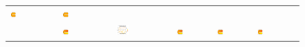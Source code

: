 \documentclass[a4paper,11pt,twoside,openright]{book}							%
\begin{document}
\begin{landscape}
\begin{figure}
\begin{tabular}{lccccccc}
\includegraphics[trim=0cm 0cm 0cm 1.8cm,clip=true,width=0.19\textwidth,valign=t]{Immagini/simulazioni_covar/SOAPtempo3.png}&
\includegraphics[trim=0cm 0cm 0cm 1.8cm,clip=true,width=0.19\textwidth,valign=t]{Immagini/simulazioni_covar/STSRtempo3.png}\\
\parbox[t]{2mm}{}&
\includegraphics[trim=0cm 0cm 0cm 1.8cm,clip=true,width=0.19\textwidth,valign=t]{Immagini/simulazioni_covar/REALEtempo4.png}&
\includegraphics[trim=0.8cm 0.8cm 2.5cm 1.2cm,clip=true,width=0.19\textwidth,valign=t]{Immagini/simulazioni_covar/Dati_tempo4.png}&
\includegraphics[trim=0cm 0cm 0cm 1.8cm,clip=true,width=0.19\textwidth,valign=t]{Immagini/simulazioni_covar/TPStempo4.png}&
\includegraphics[trim=0cm 0cm 0cm 1.8cm,clip=true,width=0.19\textwidth,valign=t]{Immagini/simulazioni_covar/SOAPtempo4.png}&
\includegraphics[trim=0cm 0cm 0cm 1.8cm,clip=true,width=0.19\textwidth,valign=t]{Immagini/simulazioni_covar/STSRtempo4.png}&


\end{tabular}
\end{figure}
\end{landscape}
\end{document}
